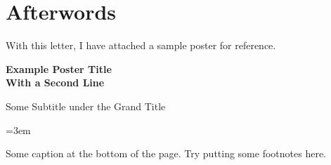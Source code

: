 \section*{Afterwords}

With this letter, I have attached a sample poster for reference.

\clearpage
\parindent=0pt





\begin{minipage}{\linewidth}
    \Huge\sffamily\bfseries
    Example Poster Title\\
    With a Second Line\par
\end{minipage}
\vskip 30pt


{\sffamily\LARGE Some Subtitle under the Grand Title}

\vfill
\columnsep=3em
\begin{multicols}{2}
    \lipsum[1-5][1-6]\par
    \lipsum[1-4][1-3]\par
\end{multicols}
\vskip 20pt

{\sffamily\small Some caption at the bottom of the page. Try putting some footnotes here.}







